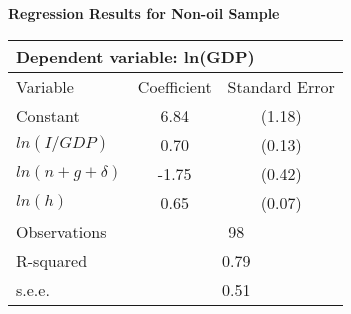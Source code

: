 \centering
\textbf{Regression Results for Non-oil Sample} \\
\begin{tabular}{lcc}
\hline
\multicolumn{3}{l}{Dependent variable: ln(GDP)} \\
\hline
Variable & Coefficient & Standard Error \\
\hline
Constant & 6.84 & (1.18) \\
$ln(I/GDP)$ & 0.70 & (0.13) \\
$ln(n+g+\delta)$ & -1.75 & (0.42) \\
$ln(h)$ & 0.65 & (0.07) \\
\hline
Observations & \multicolumn{2}{c}{98} \\
R-squared & \multicolumn{2}{c}{0.79} \\
s.e.e. & \multicolumn{2}{c}{0.51} \\
\hline
\end{tabular}
